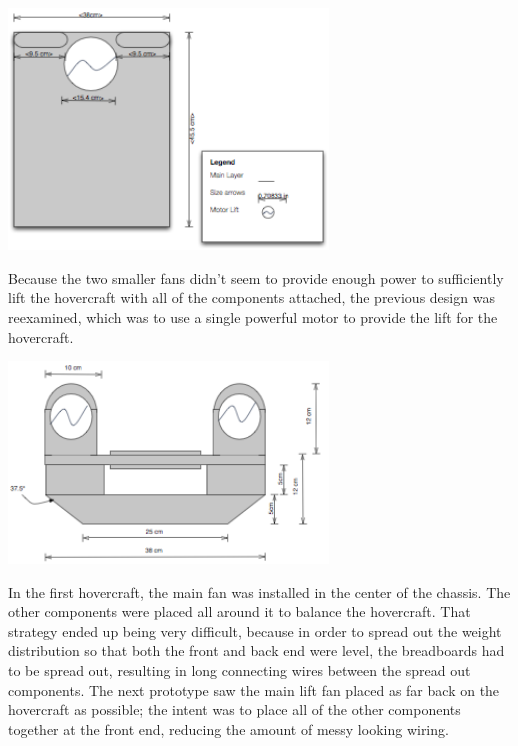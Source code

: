 \begin{minipage}{6.5in}
\begin{minipage}{6.5in}
\begin{minipage}{6.5in}
\begin{center}
  \includegraphics[width=85mm]{imageSources/Topfinal.png}
\end{center}
\label{finaltop}
\end{minipage}

Because the two smaller fans didn't seem to provide enough power to sufficiently lift the hovercraft with all of the components
attached, the previous design was reexamined, which was to use a single powerful motor to provide the lift for the hovercraft. 

\begin{minipage}{6.5in}
\begin{center}
  \includegraphics[width=85mm]{imageSources/Frontfinal.png}
\end{center}
\label{finaltop}
\end{minipage}

In the first hovercraft, the main fan was installed in the center of the chassis.  The other components were placed all around it to 
balance the hovercraft. That strategy ended up being very difficult, because in order to spread out the weight distribution so that
both the front and back end were level, the breadboards had to be spread out, resulting in long connecting wires between the spread
out components. The next prototype saw the main lift fan placed as far back on the hovercraft as possible; the intent was to place all of the other components together at the front end, reducing the amount of messy looking wiring. 


\end{minipage}
\end{minipage}
